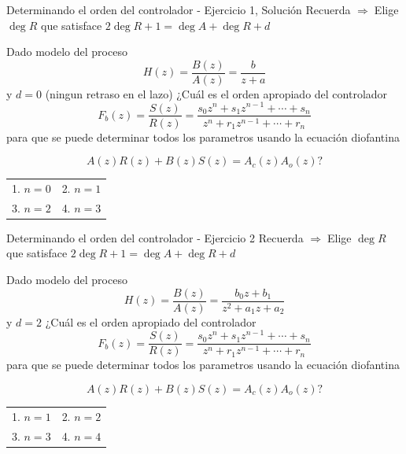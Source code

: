 \documentclass[presentation,aspectratio=169]{beamer}
\begin{document}
\begin{frame}[label={sec:orgd6b6dea}]{Determinando el orden del controlador - Ejercicio 1, Solución}
Recuerda    \alert{\(\Rightarrow\;\)Elige \(\deg R\) que satisface \(2\deg R + 1 = \deg A + \deg R + d\)}

   Dado modelo del proceso \[H(z) = \frac{B(z)}{A(z)} = \frac{b}{z + a}\] y \(d=0\) (ningun retraso en el lazo) ¿Cuál es el orden apropiado del controlador 
\[F_b(z) = \frac{S(z)}{R(z)} = \frac{s_0z^n + s_1z^{n-1} + \cdots + s_n}{z^n + r_1 z^{n-1} + \cdots + r_n}\]
para que se puede determinar todos los parametros usando la ecuación diofantina

\[ A(z)R(z) + B(z)S(z) = A_c(z)A_o(z)?\]
\begin{center}
\begin{tabular}{ll}
1. \(n = 0\) & 2. \(n = 1\)\\
3. \(n=2\) & 4. \(n=3\)\\
\end{tabular}
\end{center}
\end{frame}

\begin{frame}[label={sec:orgdf22b97}]{Determinando el orden del controlador - Ejercicio 2}
Recuerda    \alert{\(\Rightarrow\;\)Elige \(\deg R\) que satisface \(2\deg R + 1 = \deg A + \deg R + d\)}

   Dado modelo del proceso \[H(z) = \frac{B(z)}{A(z)} = \frac{b_0z + b_1}{z^2 + a_1z + a_2}\] y \(d=2\)  ¿Cuál es el orden apropiado del controlador 
\[F_b(z) = \frac{S(z)}{R(z)} = \frac{s_0z^n + s_1z^{n-1} + \cdots + s_n}{z^n + r_1 z^{n-1} + \cdots + r_n}\]
para que se puede determinar todos los parametros usando la ecuación diofantina

\[ A(z)R(z) + B(z)S(z) = A_c(z)A_o(z)?\]

\begin{center}
\begin{tabular}{ll}
1. \(n = 1\) & 2. \(n = 2\)\\
3. \(n=3\) & 4. \(n=4\)\\
\end{tabular}
\end{center}
\end{frame}
\end{document}
